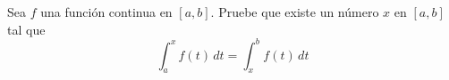 \item Sea $f$ una función continua en $[a, b]$. Pruebe que existe un número $x$ en $[a, b]$ tal que
    \[ \int_a^x f(t) \, dt = \int_x^b f(t) \, dt \]
